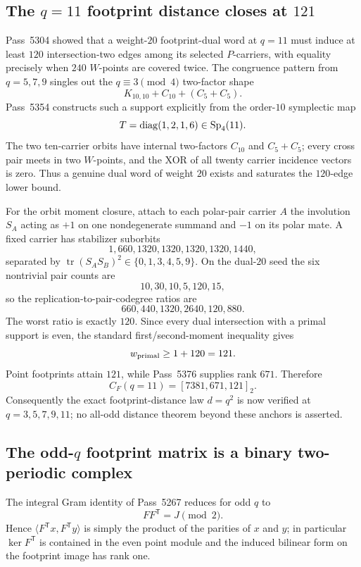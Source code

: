 \subsection{The $q=11$ footprint distance closes at $121$}
\label{sec:pass5354-q11-dual20}
Pass~5304 showed that a weight-$20$ footprint-dual word at $q=11$ must induce at
least $120$ intersection-two edges among its selected $P$-carriers, with equality
precisely when $240$ $W$-points are covered twice.  The congruence pattern from
$q=5,7,9$ singles out the $q\equiv3\pmod4$ two-factor shape
\[
 K_{10,10}+C_{10}+(C_5+C_5).
\]
Pass~5354 constructs such a support explicitly from the order-$10$ symplectic
map
\[
 T=\operatorname{diag}(1,2,1,6)\in\mathrm{Sp}_4(11).
\]
The two ten-carrier orbits have internal two-factors $C_{10}$ and $C_5+C_5$;
every cross pair meets in two $W$-points, and the XOR of all twenty carrier
incidence vectors is zero.  Thus a genuine dual word of weight $20$ exists and
saturates the $120$-edge lower bound.

For the orbit moment closure, attach to each polar-pair carrier $A$ the
involution $S_A$ acting as $+1$ on one nondegenerate summand and $-1$ on its
polar mate.  A fixed carrier has stabilizer suborbits
\[
 1,660,1320,1320,1320,1320,1440,
\]
separated by $\operatorname{tr}(S_A S_B)^2\in\{0,1,3,4,5,9\}$.  On the dual-$20$
seed the six nontrivial pair counts are
\[
 10,30,10,5,120,15,
\]
so the replication-to-pair-codegree ratios are
\[
 660,440,1320,2640,120,880.
\]
The worst ratio is exactly $120$.  Since every dual intersection with a primal
support is even, the standard first/second-moment inequality gives
\[
 w_{\rm primal}\ge 1+120=121.
\]
Point footprints attain $121$, while Pass~5376 supplies rank $671$.  Therefore
\[
 \boxed{C_F(q=11)=[7381,671,121]_2.}
\]
Consequently the exact footprint-distance law $d=q^2$ is now verified at
$q=3,5,7,9,11$; no all-odd distance theorem beyond these anchors is asserted.

\subsection{The odd-$q$ footprint matrix is a binary two-periodic complex}
\label{sec:pass5350-footprint-homology}
The integral Gram identity of Pass~5267 reduces for odd $q$ to
\[
 \boxed{FF^{\mathsf T}=J\pmod2}.
\]
Hence $\langle F^{\mathsf T}x,F^{\mathsf T}y\rangle$ is simply the product of
the parities of $x$ and $y$; in particular $\ker F^{\mathsf T}$ is contained in
the even point module and the induced bilinear form on the footprint image has
rank one.

